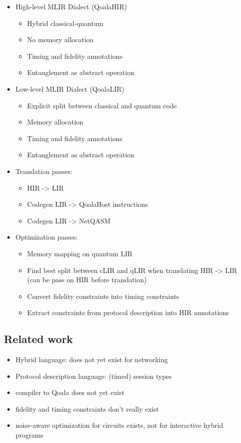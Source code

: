 \begin{itemize}
\item High-level MLIR Dialect (QoalaHIR)
    \begin{itemize}
        \item Hybrid classical-quantum
        \item No memory allocation
        \item Timing and fidelity annotations
        \item Entanglement as abstract operation
    \end{itemize}
\item Low-level MLIR Dialect (QoalaLIR)
    \begin{itemize}
        \item Explicit split between classical and quantum code
        \item Memory allocation
        \item Timing and fidelity annotations
        \item Entanglement as abstract operation
    \end{itemize}
\item Translation passes:
    \begin{itemize}
        \item HIR -> LIR
        \item Codegen LIR -> QoalaHost instructions
        \item Codegen LIR -> NetQASM
    \end{itemize}
\item Optimization passes:
    \begin{itemize}
        \item Memory mapping on quantum LIR
        \item Find best split between cLIR and qLIR when translating HIR -> LIR (can be pass on HIR before translation)
        \item Convert fidelity constraints into timing constraints
        \item Extract constraints from protocol description into HIR annotations
    \end{itemize}
\end{itemize}

\subsection{Related work}
\begin{itemize}
    \item Hybrid language: does not yet exist for networking
    \item Protocol description language: (timed) session types
    \item compiler to Qoala does not yet exist
    \item fidelity and timing constraints don't really exist
    \item noise-aware optimization for circuits exists, not for interactive hybrid programs
\end{itemize}


